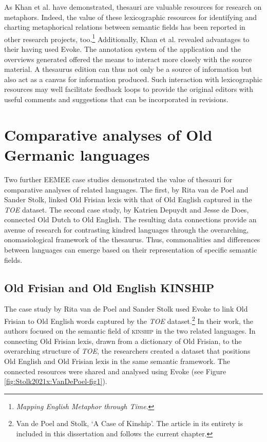 As Khan et al. have demonstrated, thesauri are valuable resources for research on metaphors. Indeed, the value of these lexicographic resources for identifying and charting metaphorical relations between semantic fields has been reported in other research projects, too.\footnote{\textit{Mapping English Metaphor through Time}.} %
Additionally, Khan et al. revealed advantages to their having used Evoke. The annotation system of the application and the overviews generated offered the means to interact more closely with the source material. A thesaurus edition can thus not only be a source of information but %
also act as a canvas for information produced. Such interaction with lexicographic resources may well facilitate feedback loops to provide the original editors with useful comments and suggestions that can be incorporated in revisions.





\section{Comparative analyses of Old Germanic languages}
\label{sect:Stolk2021x:cs-multilingual}

Two further EEMEE case studies demonstrated the value of thesauri for comparative analyses of related languages. The first, by Rita van de Poel and Sander Stolk, linked Old Frisian lexis with that of Old English captured in the \textit{TOE} dataset. The second case study, by Katrien Depuydt and Jesse de Does, connected Old Dutch to Old English. The resulting data connections provide an avenue of research for contrasting kindred languages through the overarching, onomasiological framework of the thesaurus. Thus, commonalities and differences between languages can emerge based on their %
representation of specific semantic fields.

\subsection{Old Frisian and Old English KINSHIP}
\label{sect:Stolk2021x:OldFrisianKinship}

The case study by Rita van de Poel and Sander Stolk used Evoke to link Old Frisian to Old English words captured by the \textit{TOE} dataset.\footnote{Van de Poel and Stolk, `A Case of Kinship'. The article in its entirety is included in this dissertation and follows the current chapter.} %
In their work, the authors focused on the semantic field of \textsc{kinship} in the two related languages. In connecting Old Frisian lexis, drawn from a dictionary of Old Frisian, to the overarching structure of \textit{TOE}, the researchers created a dataset that positions Old English and Old Frisian lexis in the same semantic framework. The connected resources were shared and analysed using Evoke (see Figure \ref{fig:Stolk2021x:VanDePoel-fig1}).

